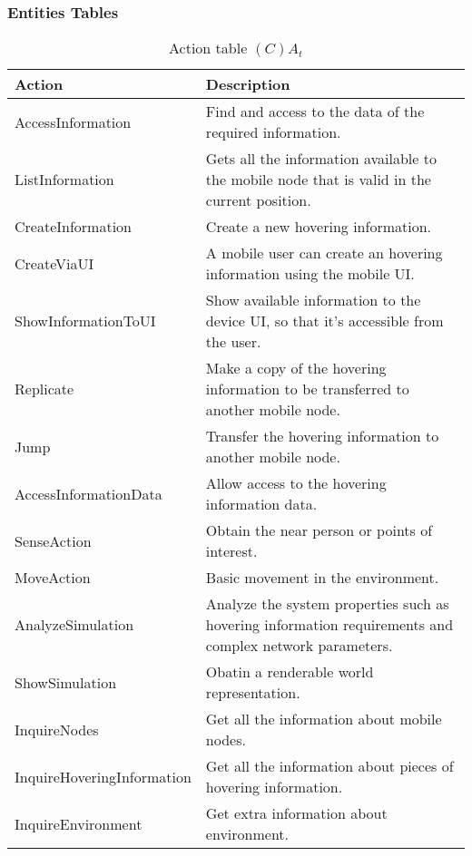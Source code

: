 \subsubsection{Entities Tables}

\begin{table}[H]
	\centering
	\begin{tabular}{|p{5cm}|p{7cm}|}
			\hline
			\textbf{Action} & \textbf{Description} \\
			\hline
			AccessInformation & Find and access to the data of the required
			information. \\
			\hline
			ListInformation & Gets all the information available to the mobile node
			that is valid in the current position.\\
			\hline
			CreateInformation & Create a new hovering information. \\
			\hline
			CreateViaUI & A mobile user can create an hovering information using the
			mobile UI. \\
			\hline
      ShowInformationToUI & Show available information to the device UI, so
      that it's accessible from the user.\\
			\hline
			Replicate & Make a copy of the hovering information to be transferred to
			another mobile node. \\
			\hline
			Jump & Transfer the hovering information to another mobile node. \\
			\hline
			AccessInformationData & Allow access to the hovering information data. \\
			\hline
			SenseAction & Obtain the near person or points of interest. \\
			\hline
			MoveAction & Basic movement in the environment. \\
      \hline
      AnalyzeSimulation & Analyze the system properties such as hovering
      information requirements and complex network parameters. \\
			\hline
			ShowSimulation & Obatin a renderable world representation. \\
			\hline
			InquireNodes & Get all the information about mobile nodes.\\
			\hline
			InquireHoveringInformation & Get all the information about pieces of
			hovering information.\\
			\hline
			InquireEnvironment & Get extra information about environment.\\
			\hline
		\end{tabular}
	\caption{Action table $(C)A_t$}
	\label{tab:cat}
\end{table}

